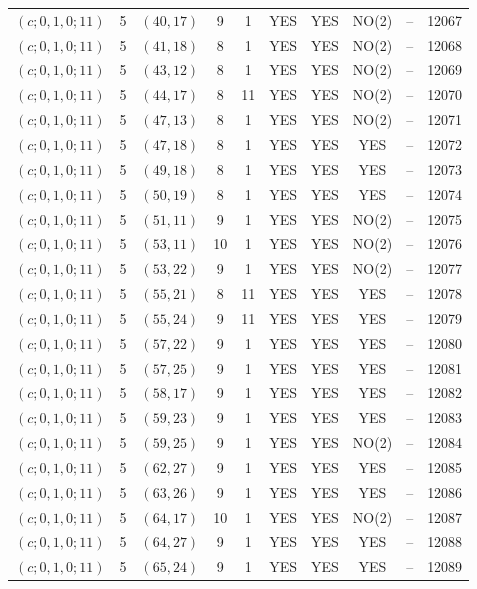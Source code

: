 \begin{longtable}{|c|c|c|c|c|c|c|c|c|c|}
$(c; 0, 1, 0; 11)$ & 5 & $(40, 17)$ & 9 & 1 & YES & YES & NO(2) & -- & 12067\\
$(c; 0, 1, 0; 11)$ & 5 & $(41, 18)$ & 8 & 1 & YES & YES & NO(2) & -- & 12068\\
$(c; 0, 1, 0; 11)$ & 5 & $(43, 12)$ & 8 & 1 & YES & YES & NO(2) & -- & 12069\\
$(c; 0, 1, 0; 11)$ & 5 & $(44, 17)$ & 8 & 11 & YES & YES & NO(2) & -- & 12070\\
$(c; 0, 1, 0; 11)$ & 5 & $(47, 13)$ & 8 & 1 & YES & YES & NO(2) & -- & 12071\\
$(c; 0, 1, 0; 11)$ & 5 & $(47, 18)$ & 8 & 1 & YES & YES & YES & -- & 12072\\
$(c; 0, 1, 0; 11)$ & 5 & $(49, 18)$ & 8 & 1 & YES & YES & YES & -- & 12073\\
$(c; 0, 1, 0; 11)$ & 5 & $(50, 19)$ & 8 & 1 & YES & YES & YES & -- & 12074\\
$(c; 0, 1, 0; 11)$ & 5 & $(51, 11)$ & 9 & 1 & YES & YES & NO(2) & -- & 12075\\
$(c; 0, 1, 0; 11)$ & 5 & $(53, 11)$ & 10 & 1 & YES & YES & NO(2) & -- & 12076\\
$(c; 0, 1, 0; 11)$ & 5 & $(53, 22)$ & 9 & 1 & YES & YES & NO(2) & -- & 12077\\
$(c; 0, 1, 0; 11)$ & 5 & $(55, 21)$ & 8 & 11 & YES & YES & YES & -- & 12078\\
$(c; 0, 1, 0; 11)$ & 5 & $(55, 24)$ & 9 & 11 & YES & YES & YES & -- & 12079\\
$(c; 0, 1, 0; 11)$ & 5 & $(57, 22)$ & 9 & 1 & YES & YES & YES & -- & 12080\\
$(c; 0, 1, 0; 11)$ & 5 & $(57, 25)$ & 9 & 1 & YES & YES & YES & -- & 12081\\
$(c; 0, 1, 0; 11)$ & 5 & $(58, 17)$ & 9 & 1 & YES & YES & YES & -- & 12082\\
$(c; 0, 1, 0; 11)$ & 5 & $(59, 23)$ & 9 & 1 & YES & YES & YES & -- & 12083\\
$(c; 0, 1, 0; 11)$ & 5 & $(59, 25)$ & 9 & 1 & YES & YES & NO(2) & -- & 12084\\
$(c; 0, 1, 0; 11)$ & 5 & $(62, 27)$ & 9 & 1 & YES & YES & YES & -- & 12085\\
$(c; 0, 1, 0; 11)$ & 5 & $(63, 26)$ & 9 & 1 & YES & YES & YES & -- & 12086\\
$(c; 0, 1, 0; 11)$ & 5 & $(64, 17)$ & 10 & 1 & YES & YES & NO(2) & -- & 12087\\
$(c; 0, 1, 0; 11)$ & 5 & $(64, 27)$ & 9 & 1 & YES & YES & YES & -- & 12088\\
$(c; 0, 1, 0; 11)$ & 5 & $(65, 24)$ & 9 & 1 & YES & YES & YES & -- & 12089\\

\end{longtable}
